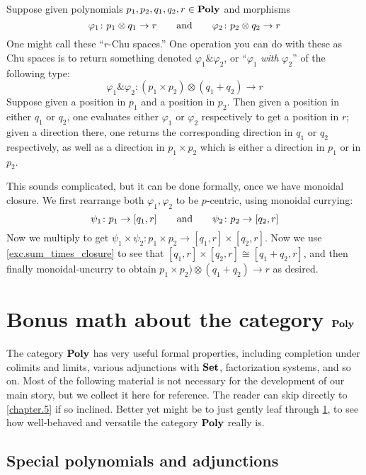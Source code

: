 \documentclass[Book-Poly]{subfiles}
\begin{document}
\begin{example}[Chu $\&$]
Suppose given polynomials $p_1,p_2,q_1,q_2,r\in\textbf{Poly}$ and morphisms
\[
	\varphi_1\colon p_1\otimes q_1\to r
	\qquad\text{and}\qquad
	\varphi_2\colon p_2\otimes q_2\to r
\]
One might call these ``$r$-Chu spaces.'' One operation you can do with these as Chu spaces is to return something denoted $\varphi_1\&\varphi_2$, or ``$\varphi_1$ \emph{with} $\varphi_2$'' of the following type:
\[
\varphi_1\&\varphi_2\colon (p_1\times p_2)\otimes (q_1+q_2)\to r
\]
Suppose given a position in $p_1$ and a position in $p_2$. Then given a position in either $q_1$ or $q_2$, one evaluates either $\varphi_1$ or $\varphi_2$ respectively to get a position in $r$; given a direction there, one returns the corresponding direction in $q_1$ or $q_2$ respectively, as well as a direction in $p_1\times p_2$ which is either a direction in $p_1$ or in $p_2$.

This sounds complicated, but it can be done formally, once we have monoidal closure. We first rearrange both $\varphi_1,\varphi_2$ to be $p$-centric, using monoidal currying:
\[
\psi_1\colon p_1\to [q_1,r]
\qquad\text{and}\qquad
\psi_2\colon p_2\to [q_2,r]
\]
Now we multiply to get $\psi_1\times\psi_2\colon p_1\times p_2\to[q_1,r]\times[q_2,r]$. Now we use \cref{exc.sum_times_closure} to see that $[q_1,r]\times[q_2,r]\cong[q_1+q_2,r]$, and then finally monoidal-uncurry to obtain $p_1\times p_2)\otimes(q_1+q_2)\to r$ as desired.
\end{example}


\section{Bonus math about the category $\textbf{Poly}$}\label{sec.bonus_poly}

The category $\textbf{Poly}$ has very useful formal properties, including completion under colimits and limits, various adjunctions with $\textbf{Set}$, factorization systems, and so on. Most of the following material is not necessary for the development of our main story, but we collect it here for reference. The reader can skip directly to \cref{chapter.5} if so inclined. Better yet might be to just gently leaf through \cref{sec.bonus_poly}, to see how well-behaved and versatile the category $\textbf{Poly}$ really is.

\subsection{Special polynomials and adjunctions}
\end{document}
